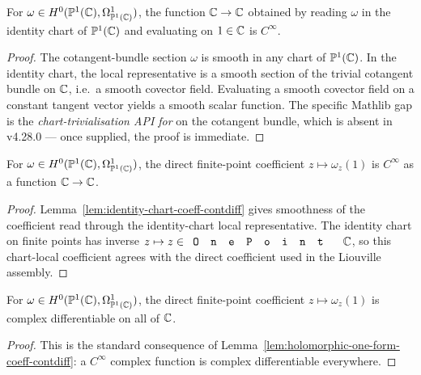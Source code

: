 \begin{lemma}
\label{lem:identity-chart-coeff-contdiff}
For \(\omega\in H^{0}(\mathbb{P}^{1}(\mathbb{C}),\Omega^{1}_{\mathbb{P}^{1}(\mathbb{C})})\), the function
\(\mathbb{C}\to\mathbb{C}\) obtained by reading \(\omega\) in the identity chart
of \(\mathbb{P}^{1}(\mathbb{C})\) and evaluating on \(1\in\mathbb{C}\) is \(C^{\infty}\).
\leanok
\end{lemma}
\begin{proof}\leanok
The cotangent-bundle section \(\omega\) is smooth in any chart of
\(\mathbb{P}^{1}(\mathbb{C})\). In the identity chart, the local representative is a
smooth section of the trivial cotangent bundle on \(\mathbb{C}\), i.e.\ a
smooth covector field. Evaluating a smooth covector field on a
constant tangent vector yields a smooth scalar function. The
specific Mathlib gap is the \emph{chart-trivialisation API for
} on the cotangent bundle, which is absent
in v4.28.0 --- once supplied, the proof is immediate.
\end{proof}

\begin{lemma}
\label{lem:holomorphic-one-form-coeff-contdiff}
For \(\omega\in H^{0}(\mathbb{P}^{1}(\mathbb{C}),\Omega^{1}_{\mathbb{P}^{1}(\mathbb{C})})\), the direct finite-point
coefficient \(z\mapsto \omega_{z}(1)\) is \(C^{\infty}\) as a function
\(\mathbb{C}\to\mathbb{C}\).
\leanok
\end{lemma}
\begin{proof}\leanok
Lemma~\ref{lem:identity-chart-coeff-contdiff} gives smoothness of the
coefficient read through the identity-chart local representative. The identity
chart on finite points has inverse \(z\mapsto z\in\code{OnePoint}\,\C\), so this
chart-local coefficient agrees with the direct coefficient used in the
Liouville assembly.
\end{proof}

\begin{lemma}
\label{lem:holomorphic-one-form-coeff-entire}
For \(\omega\in H^{0}(\mathbb{P}^{1}(\mathbb{C}),\Omega^{1}_{\mathbb{P}^{1}(\mathbb{C})})\), the direct finite-point
coefficient \(z\mapsto \omega_{z}(1)\) is complex differentiable on all of
\(\mathbb{C}\).
\leanok
\end{lemma}
\begin{proof}\leanok
This is the standard consequence of
Lemma~\ref{lem:holomorphic-one-form-coeff-contdiff}: a \(C^{\infty}\) complex
function is complex differentiable everywhere.
\end{proof}


